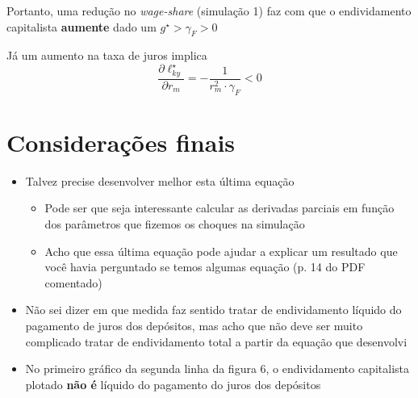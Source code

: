 \documentclass[11pt]{article}
\begin{document}
Portanto, uma redução no \emph{wage-share} (simulação 1) faz com que o endividamento capitalista \textbf{aumente} dado um \(g^\star > \gamma_F> 0\)

Já um aumento na taxa de juros implica
$$
\frac{\partial \ell_{ky}^\star}{\partial r_m} = -\frac{1}{r_m^2\cdot \gamma_F} < 0
$$


\section*{Considerações finais}
\label{sec:org2f3ca5b}

\begin{itemize}
\item Talvez precise desenvolver melhor esta última equação
\begin{itemize}
\item Pode ser que seja interessante calcular as derivadas parciais em função dos parâmetros que fizemos os choques na simulação
\item Acho que essa última equação pode ajudar a explicar um resultado que você havia perguntado se temos algumas equação (p. 14 do PDF comentado)
\end{itemize}
\item Não sei dizer em que medida faz sentido tratar de endividamento líquido do pagamento de juros dos depósitos, mas acho que não deve ser muito complicado tratar de endividamento total a partir da equação que desenvolvi
\item No primeiro gráfico da segunda linha da figura 6, o endividamento capitalista plotado \textbf{não é} líquido do pagamento do juros dos depósitos
\end{itemize}
\end{document}
